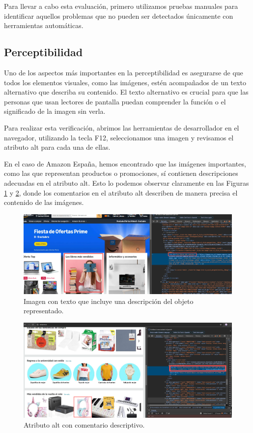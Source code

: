 \documentclass[letterpaper, 12pt]{report}
\begin{document}
Para llevar a cabo esta evaluación, primero utilizamos pruebas manuales para identificar aquellos problemas que no pueden ser detectados únicamente con herramientas automáticas. 

\subsection{Perceptibilidad}

Uno de los aspectos más importantes en la perceptibilidad es asegurarse de que todos los elementos visuales, como las imágenes, estén acompañados de un texto alternativo que describa su contenido. El texto alternativo es crucial para que las personas que usan lectores de pantalla puedan comprender la función o el significado de la imagen sin verla.

Para realizar esta verificación, abrimos las herramientas de desarrollador en el navegador, utilizando la tecla F12, seleccionamos una imagen y revisamos el atributo alt para cada una de ellas.

En el caso de Amazon España, hemos encontrado que las imágenes importantes, como las que representan productos o promociones, sí contienen descripciones adecuadas en el atributo alt. Esto lo podemos observar claramente en las Figuras \ref{fig:1} y \ref{fig:2}, donde los comentarios en el atributo alt describen de manera precisa el contenido de las imágenes.

\begin{figure}[H]
\centering
\includegraphics[width=1\textwidth]{figure1.png}
\caption{Imagen con texto que incluye una descripción del objeto representado.}
\label{fig:1}
\end{figure}

\begin{figure}[H]
\centering
\includegraphics[width=1\textwidth]{figure2.png}
\caption{Atributo alt con comentario descriptivo.}
\label{fig:2}
\end{figure}
\end{document}
